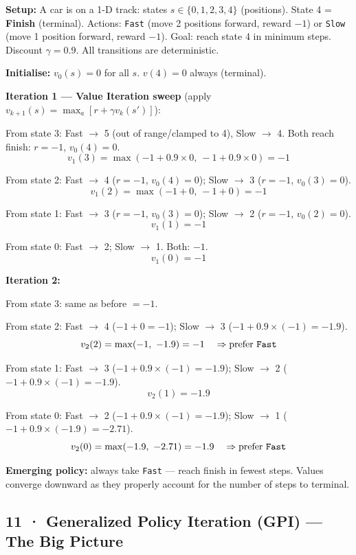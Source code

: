 \documentclass[11pt,a4paper]{article}
\begin{document}
\begin{tcolorbox}[exam={Race Car Problem (Simplified)}]
\textbf{Setup:} A car is on a 1-D track: states $s \in \{0, 1, 2, 3, 4\}$ (positions).
State 4 = \textbf{Finish} (terminal). Actions: \texttt{Fast} (move 2 positions forward, reward $-1$)
or \texttt{Slow} (move 1 position forward, reward $-1$). Goal: reach state 4 in minimum steps.
Discount $\gamma = 0.9$. All transitions are deterministic.

\medskip
\textbf{Initialise:} $v_0(s) = 0$ for all $s$. $v(4) = 0$ always (terminal).

\medskip
\textbf{Iteration 1 — Value Iteration sweep} (apply $v_{k+1}(s) = \max_a[r + \gamma v_k(s')]$):

\smallskip
From state 3: Fast $\to$ 5 (out of range/clamped to 4), Slow $\to$ 4.
Both reach finish: $r = -1$, $v_0(4) = 0$.
\[ v_1(3) = \max(-1 + 0.9\times0,\ -1 + 0.9\times0) = -1 \]

From state 2: Fast $\to$ 4 ($r=-1$, $v_0(4)=0$); Slow $\to$ 3 ($r=-1$, $v_0(3)=0$).
\[ v_1(2) = \max(-1 + 0,\ -1 + 0) = -1 \]

From state 1: Fast $\to$ 3 ($r=-1$, $v_0(3)=0$); Slow $\to$ 2 ($r=-1$, $v_0(2)=0$).
\[ v_1(1) = -1 \]

From state 0: Fast $\to$ 2; Slow $\to$ 1. Both: $-1$.
\[ v_1(0) = -1 \]

\medskip
\textbf{Iteration 2:}

From state 3: same as before $= -1$.

From state 2: Fast $\to$ 4 ($-1 + 0 = -1$); Slow $\to$ 3 ($-1 + 0.9\times(-1) = -1.9$).
\[ v_2(2) = \max(-1,\ -1.9) = -1 \quad \Rightarrow \text{prefer \texttt{Fast}} \]

From state 1: Fast $\to$ 3 ($-1 + 0.9\times(-1) = -1.9$); Slow $\to$ 2 ($-1 + 0.9\times(-1) = -1.9$).
\[ v_2(1) = -1.9 \]

From state 0: Fast $\to$ 2 ($-1 + 0.9\times(-1) = -1.9$); Slow $\to$ 1 ($-1 + 0.9\times(-1.9)=-2.71$).
\[ v_2(0) = \max(-1.9,\ -2.71) = -1.9 \quad \Rightarrow \text{prefer \texttt{Fast}} \]

\textbf{Emerging policy:} always take \texttt{Fast} — reach finish in fewest steps.
Values converge downward as they properly account for the number of steps to terminal.
\end{tcolorbox}

\subsection*{11 · Generalized Policy Iteration (GPI) — The Big Picture}
\end{document}

